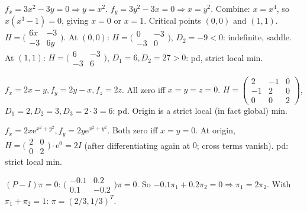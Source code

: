 \begin{solutions}
  \item $f_{x} = 3 x^{2} - 3 y = 0 \Rightarrow y = x^{2}$.
        $f_{y} = 3 y^{2} - 3 x = 0 \Rightarrow x = y^{2}$. Combine:
        $x = x^{4}$, so $x(x^{3} - 1) = 0$, giving $x = 0$ or $x = 1$.
        Critical points $(0, 0)$ and $(1, 1)$.
        $H = \bigl(\begin{smallmatrix} 6 x & -3 \\ -3 & 6 y \end{smallmatrix}\bigr)$.
        At $(0, 0)$:
        $H = \bigl(\begin{smallmatrix} 0 & -3 \\ -3 & 0 \end{smallmatrix}\bigr)$,
        $D_{2} = -9 < 0$: indefinite, saddle. At $(1, 1)$:
        $H = \bigl(\begin{smallmatrix} 6 & -3 \\ -3 & 6 \end{smallmatrix}\bigr)$,
        $D_{1} = 6, D_{2} = 27 > 0$: pd, strict local min.

  \item $f_{x} = 2 x - y, f_{y} = 2 y - x, f_{z} = 2 z$. All zero iff
        $x = y = z = 0$.
        $H = \begin{pmatrix} 2 & -1 & 0 \\ -1 & 2 & 0 \\ 0 & 0 & 2 \end{pmatrix}$,
        $D_{1} = 2, D_{2} = 3, D_{3} = 2 \cdot 3 = 6$: pd. Origin is a
        strict local (in fact global) min.

  \item $f_{x} = 2 x \mathrm{e}^{x^{2} + y^{2}}, f_{y} = 2 y \mathrm{e}^{x^{2} + y^{2}}$.
        Both zero iff $x = y = 0$. At origin,
        $H = \bigl(\begin{smallmatrix} 2 & 0 \\ 0 & 2 \end{smallmatrix}\bigr) \cdot \mathrm{e}^{0} = 2 I$
        (after differentiating again at $0$; cross terms vanish). pd:
        strict local min.

  \item $(P - I)\pi = 0$:
        $\bigl(\begin{smallmatrix} -0.1 & 0.2 \\ 0.1 & -0.2 \end{smallmatrix}\bigr)\pi = 0$.
        So $-0.1 \pi_{1} + 0.2 \pi_{2} = 0 \Rightarrow \pi_{1} = 2 \pi_{2}$.
        With $\pi_{1} + \pi_{2} = 1$: $\pi = (2/3, 1/3)^{T}$.


\end{solutions}
